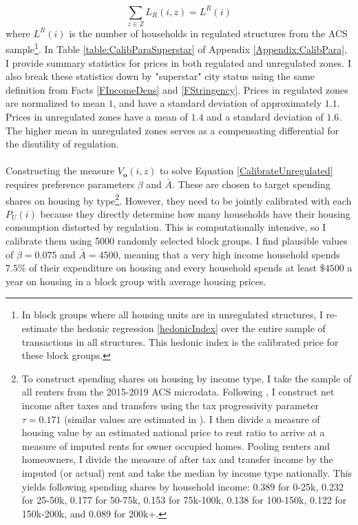 \documentclass[12pt]{article}
\begin{document}
\begin{equation*}
	\sum_{z \in Z}L_{R}(i, z) = L^{R}(i)
\end{equation*}
where $L^{R}(i)$ is the number of households in regulated structures from the ACS sample\footnote{In block groups where all housing units are in unregulated structures, I re-estimate the hedonic regression \eqref{hedonicIndex} over the entire sample of transactions in all structures. This hedonic index is the calibrated price for these block groups.}. In Table \ref{table:CalibParaSuperstar} of Appendix \ref{Appendix:CalibPara}, I provide summary statistics for prices in both regulated and unregulated zones. I also break these statistics down by "superstar" city status using the same definition from Facts \ref{FIncomeDens} and \ref{FStringency}. Prices in regulated zones are normalized to mean $1$, and have a standard deviation of approximately $1.1$. Prices in unregulated zones have a mean of $1.4$ and a standard deviation of $1.6$. The higher mean in unregulated zones serves as a compensating differential for the disutility of regulation. 
  
\paragraph*{}
Constructing the measure $V_{\boldsymbol{o}}(i, z)$ to solve Equation \eqref{CalibrateUnregulated} requires preference parameters $\beta$ and $\bar{A}$. These are chosen to target spending shares on housing by type\footnote{To construct spending shares on housing by income type, I take the sample of all renters from the 2015-2019 ACS microdata. Following \cite{FinlayWilliams}, I construct net income after taxes and transfers using the tax progressivity parameter $\tau = 0.171$ (similar values are estimated in \cite{heathcoteetal}). I then divide a measure of housing value by an estimated national price to rent ratio to arrive at a measure of imputed rents for owner occupied homes. Pooling renters and homeowners, I divide the measure of after tax and transfer income by the imputed (or actual) rent and take the median by income type nationally. This yields following spending shares by household income: 0.389 for 0-25k, 0.232 for 25-50k, 0.177 for 50-75k, 0.153 for 75k-100k, 0.138 for 100-150k, 0.122 for 150k-200k, and 0.089 for 200k+.}. However, they need to be jointly calibrated with each $P_{U}(i)$ because they directly determine how many households have their housing consumption distorted by regulation. This is computationally intensive, so I calibrate them using 5000 randomly selected block groups. I find plausible values of $\beta = 0.075$ and $\bar{A} = 4500$, meaning that a very high income household spends $7.5\%$ of their expenditure on housing and every household spends at least $\$4500$ a year on housing in a block group with average housing prices. 
\end{document}
